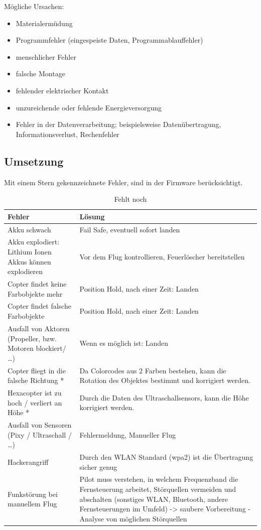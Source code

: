   Mögliche Ursachen: \cite{tech_def}
  \begin{itemize}
  \item Materialermüdung
  \item Programmfehler (eingespeiste Daten, Programmablauffehler)
  \item menschlicher Fehler
  \item falsche Montage
  \item fehlender elektrischer Kontakt
  \item unzureichende oder fehlende Energieversorgung
  \item Fehler in der Datenverarbeitung; beispielsweise Datenübertragung, Informationsverlust, Rechenfehler
  \end{itemize}


  \subsection{Umsetzung}
  Mit einem Stern gekennzeichnete Fehler, sind in der Firmware berücksichtigt.

\begin{table}[H]
\centering
\begin{tabular}{|p{7cm}|p{7cm}|}
\hline Fehler & Lösung\\\hline
\hline Akku schwach & Fail Safe, eventuell sofort landen\\
\hline Akku explodiert: Lithium Ionen Akkus können explodieren & Vor dem Flug kontrollieren, Feuerlöscher bereitstellen\\
\hline Copter findet keine Farbobjekte mehr & Position Hold, nach einer Zeit: Landen\\
\hline Copter findet falsche Farbobjekte & Position Hold, nach einer Zeit: Landen \\
\hline Ausfall von Aktoren (Propeller, bzw. Motoren blockiert/ …) &  Wenn es möglich ist: Landen\\
\hline Copter fliegt in die falsche Richtung * & Da Colorcodes aus 2 Farben bestehen, kann die Rotation des Objektes bestimmt und korrigiert werden. \\
\hline Hexacopter ist zu hoch / verliert an Höhe * & Durch die Daten des Ultraschallsensors, kann die Höhe korrigiert werden.\\
\hline Ausfall von Sensoren (Pixy / Ultraschall / …) & Fehlermeldung, Manueller Flug\\
\hline Hackerangriff & Durch den WLAN Standard (wpa2) ist die Übertragung sicher genug\\
\hline Funkstörung bei manuellem Flug & Pilot muss verstehen, in welchem Frequenzband die Fernsteuerung arbeitet, Störquellen vermeiden und abschalten (sonstiges WLAN, Bluetooth, andere Fernsteuerungen im Umfeld) -> saubere Vorbereitung - Analyse von möglichen Störquellen\\
\end{tabular}
\caption{Fehlt noch}
\end{table}

